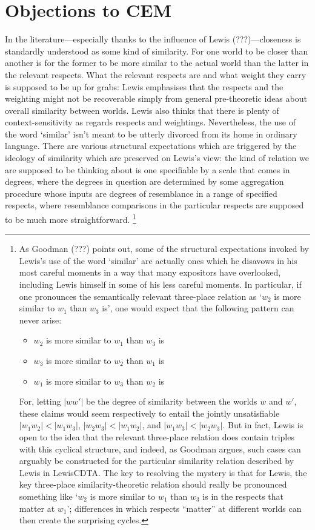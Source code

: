 \documentclass[If.tex]{subfiles}
\begin{document}
\section{Objections to CEM} \label{objections-to-cem} 
In the literature---especially thanks to the influence of Lewis (???)---closeness is standardly understood as some kind of similarity. For one world to be closer than another is for the former to be more similar to the actual world than the latter in the relevant respects. What the relevant respects are and what weight they carry is supposed to be up for grabs: Lewis emphasises that the respects and the weighting might not be recoverable simply from general pre-theoretic ideas about overall similarity between worlds. Lewis also thinks that there is plenty of context-sensitivity as regards respects and weightings. Nevertheless, the use of the word ‘similar’ isn't meant to be utterly divorced from its home in ordinary language. There are various structural expectations which are triggered by the ideology of similarity which are preserved on Lewis's view: the kind of relation we are supposed to be thinking about is one specifiable by a scale that comes in degrees, where the degrees in question are determined by some aggregation procedure whose inputs are degrees of resemblance in a range of specified respects, where resemblance comparisons in the particular respects are supposed to be much more straightforward.%
\footnote{As Goodman (???) points out, some of the structural expectations invoked by Lewis's use of the word ‘similar’ are actually ones which he disavows in his most careful moments in a way that many expositors have overlooked, including Lewis himself in some of his less careful moments. In particular, if one pronounces the semantically relevant three-place relation as ‘$w_2$ is more similar to $w_1$ than $w_3$ is’, one would expect that the following pattern can never arise:
	\begin{itemize}
		\item
		$w_2$ is more similar to $w_1$ than
		$w_3$ is
		\item
		$w_3$ is more similar to $w_2$ than
		$w_1$ is
		\item
		$w_1$ is more similar to $w_3$ than
		$w_2$ is
	\end{itemize}
	For, letting $|ww'|$ be the degree of similarity between the worlds $w$ and $w'$, these claims would seem respectively to entail the jointly unsatisfiable $|w_1w_2|<|w_1w_3|$, $|w_2w_3|<|w_1w_2|$, and $|w_1w_3|<|w_2w_3|$. But in fact, Lewis is open to the idea that the relevant three-place relation does contain triples with this cyclical structure, and indeed, as Goodman argues, such cases can arguably be constructed for the particular similarity relation described by Lewis in LewisCDTA. The key to resolving the mystery is that for Lewis, the key three-place similarity-theoretic relation should really be pronounced something like ‘$w_2$ is more similar to $w_1$ than $w_3$ is in the respects that matter at $w_1$’; differences in which respects “matter” at different worlds can then create the surprising cycles.}
\end{document}
